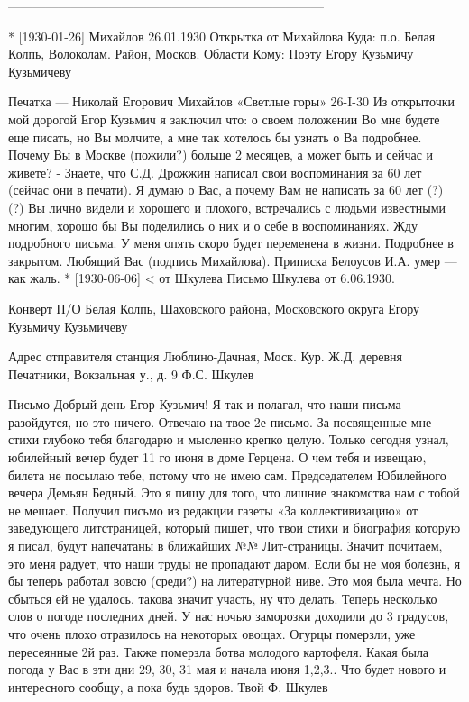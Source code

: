 ---------------------------------------------------------------------------

* [1930-01-26] Михайлов
26.01.1930
Открытка от Михайлова
Куда: п.о. Белая Колпь, Волоколам. Район, Москов. Области
Кому: Поэту Егору Кузьмичу Кузьмичеву

Печатка — Николай Егорович Михайлов 
«Светлые горы» 26-I-30
Из открыточки мой дорогой Егор Кузьмич я заключил что: о своем положении Во мне будете еще писать, но Вы молчите, а мне так хотелось бы узнать о Ва  подробнее. Почему Вы в Москве (пожили?) больше 2 месяцев, а может быть и сейчас и живете? - Знаете, что С.Д. Дрожжин написал свои воспоминания за 60 лет (сейчас они  в печати).
Я думаю о Вас, а почему  Вам не написать за 60 лет (?) (?) Вы лично видели и хорошего и плохого, встречались с людьми известными многим, хорошо бы Вы поделились о них и о себе в воспоминаниях. Жду подробного письма. У меня опять скоро будет переменена в жизни. Подробнее в закрытом. Любящий Вас (подпись Михайлова).
Приписка
Белоусов И.А. умер — как жаль.
* [1930-06-06] < от Шкулева
Письмо Шкулева от 6.06.1930.


Конверт
П/О Белая Колпь, Шаховского района, Московского округа
Егору Кузьмичу Кузьмичеву

Адрес отправителя
станция Люблино-Дачная, Моск. Кур. Ж.Д. деревня Печатники, Вокзальная у., д. 9 Ф.С. Шкулев


Письмо
Добрый день 
Егор Кузьмич!
Я так и полагал, что наши письма разойдутся, но это ничего. Отвечаю на твое 2е письмо. За посвященные мне стихи глубоко тебя благодарю и мысленно крепко целую. Только сегодня узнал, юбилейный вечер будет 11 го июня в доме Герцена. О чем тебя и извещаю, билета не посылаю тебе, потому что не имею сам.
Председателем Юбилейного вечера Демьян Бедный. Это я пишу для того, что лишние знакомства нам с тобой не мешает. 
Получил письмо из редакции газеты «За коллективизацию» от заведующего литстраницей, который пишет, что твои стихи и биография которую я писал, будут напечатаны в ближайших №№ Лит-страницы. Значит почитаем, это меня радует, что наши труды не пропадают даром.
Если бы не моя болезнь, я бы теперь работал вовсю (среди?) на литературной ниве. Это моя была мечта. Но сбыться ей не удалось, такова значит участь, ну что делать.
Теперь несколько слов о погоде последних дней. У нас ночью заморозки доходили до 3 градусов, что очень плохо отразилось на некоторых овощах. Огурцы померзли, уже пересеянные 2й раз. Также померзла ботва молодого картофеля. Какая была погода у Вас в эти дни 29, 30, 31 мая и начала июня 1,2,3..
Что будет нового и интересного сообщу, а пока будь здоров.
Твой Ф. Шкулев

